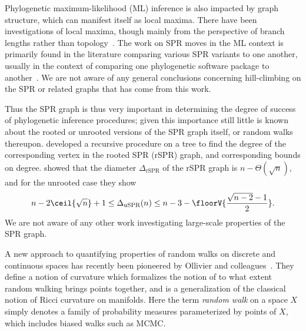 \documentclass[11pt,onecolumn,conference]{IEEEtran}
\begin{document}
Phylogenetic maximum-likelihood (ML) inference is also impacted by graph structure, which can manifest itself as local maxima.
There have been investigations of local maxima, though mainly from the perspective of branch lengths rather than topology~\cite{Fukami1989-fs,Steel1994-pt,Chor2003-wh,Chor2000-ea}.
The work on SPR moves in the ML context is primarily found in the literature comparing various SPR variants to one another, usually in the context of comparing one phylogenetic software package to another~\cite{Hordijk2005-dl,Stamatakis2006-yz,Price2010-fi,Guindon2010-lo}.
We are not aware of any general conclusions concerning hill-climbing on the SPR or related graphs that has come from this work.

Thus the SPR graph is thus very important in determining the degree of success of phylogenetic inference procedures; given this importance still little is known about the rooted or unrooted versions of the SPR graph itself, or random walks thereupon.
\cite{Song2003-gf} developed a recursive procedure on a tree to find the degree of the corresponding vertex in the rooted SPR (rSPR) graph, and corresponding bounds on degree.
\cite{Ding2011-bj} showed that the diameter $\Delta_{\text{rSPR}}$ of the rSPR graph is $n - \Theta(\sqrt n)$, and for the unrooted case they show
$$ n - 2\ceil{\sqrt{n}} + 1
\le \Delta_{\text{uSPR}}(n)
\le n - 3 - \floorV{\frac{\sqrt{n - 2} - 1}{2}}.
$$
We are not aware of any other work investigating large-scale properties of the SPR graph.

A new approach to quantifying properties of random walks on discrete and continuous spaces has recently been pioneered by Ollivier and colleagues~\cite{Ollivier2009-bw,Joulin2010-jg}.
They define a notion of curvature which formalizes the notion of to what extent random walking brings points together, and is a generalization of the classical notion of Ricci curvature on manifolds.
Here the term \emph{random walk} on a space $X$ simply denotes a family of probability measures parameterized by points of $X$, which includes biased walks such as MCMC.
\end{document}
